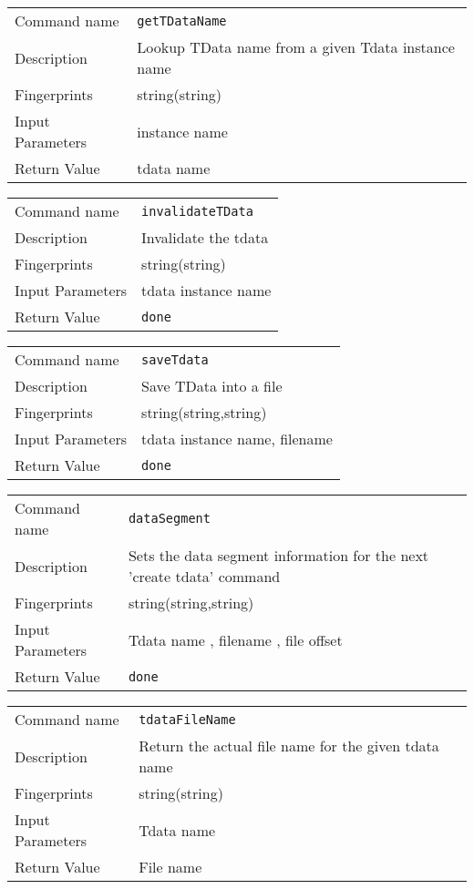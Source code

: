 \noindent
\begin{tabular}{l|p{5in}}
\hline
Command name &{\tt getTDataName }\\ 
Description &
Lookup TData name from a given Tdata instance name
 	\\
Fingerprints & string(string)\\
Input Parameters&instance name\\
Return Value&tdata name\\
\hline
\end{tabular}
\bigskip

\noindent
\begin{tabular}{l|p{5in}}
\hline
Command name &{\tt invalidateTData }\\ 
Description &
Invalidate the tdata
 	\\
Fingerprints & string(string)\\
Input Parameters&tdata instance name\\
Return Value&{\tt done}\\
\hline
\end{tabular}
\bigskip

\noindent
\begin{tabular}{l|p{5in}}
\hline
Command name &{\tt saveTdata }\\ 
Description &
Save TData into a file
 	\\
Fingerprints & string(string,string)\\
Input Parameters&tdata instance name, filename\\
Return Value&{\tt done}\\
\hline
\end{tabular}
\bigskip

\noindent
\begin{tabular}{l|p{5in}}
\hline
Command name &{\tt dataSegment }\\ 
Description &
 Sets the data segment information for the next 'create tdata' command 
 	\\
Fingerprints & string(string,string)\\
Input Parameters& Tdata name , filename , file offset \\
Return Value&{\tt done}\\
\hline
\end{tabular}
\bigskip

\noindent
\begin{tabular}{l|p{5in}}
\hline
Command name &{\tt tdataFileName }\\ 
Description &
 Return the actual file name for the given tdata name 
 	\\
Fingerprints & string(string)\\
Input Parameters& Tdata name \\
Return Value& File name \\
\hline
\end{tabular}
\bigskip

